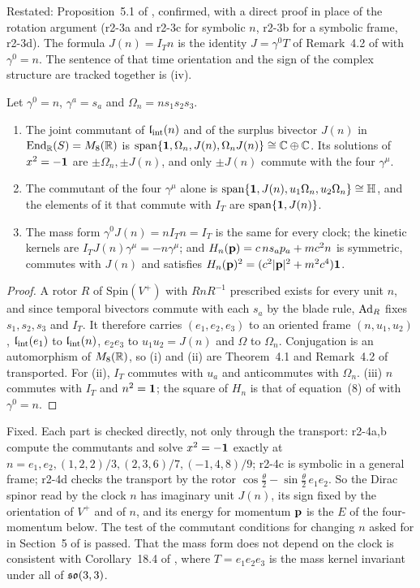 Restated: Proposition~5.1 of \cite{FMB}, confirmed, with a direct proof in place of the rotation argument (r2-3a and r2-3c for symbolic $n$, r2-3b for a
symbolic frame, r2-3d). The formula $J(n)=I_Tn$ is the identity $J=\gamma^0T$ of Remark~4.2 of \cite{ES17} with $\gamma^0=n$. The sentence of
\cite{FMB} that time orientation and the sign of the complex structure are tracked together is (iv).

\begin{theorem}
\label{r2:thm:i}
Let $\gamma^0=n$, $\gamma^a=s_a$ and $\Omega_n=ns_1s_2s_3$.
\begin{enumerate}[label=(\roman*),leftmargin=2.2em]
\item The joint commutant of $\mathfrak l_{\rm int}(n)$ and of the surplus bivector $J(n)$ in $\operatorname{End}_{\mathbb{R}}(S)=M_8(\mathbb{R})$ is $\operatorname{span}\{\mathbf 1,\Omega_n,J(n),\Omega_nJ(n)\}
\cong\mathbb{C}\oplus\mathbb{C}$. Its solutions of $x^2=-\mathbf 1$ are $\pm\Omega_n,\pm J(n)$, and only $\pm J(n)$ commute with the four $\gamma^\mu$.
\item The commutant of the four $\gamma^\mu$ alone is $\operatorname{span}\{\mathbf 1,J(n),u_1\Omega_n,u_2\Omega_n\}\cong\mathbb{H}$, and the elements of it that
commute with $I_T$ are $\operatorname{span}\{\mathbf 1,J(n)\}$.
\item The mass form $\gamma^0J(n)=nI_Tn=I_T$ is the same for every clock; the kinetic kernels are $I_TJ(n)\gamma^\mu=-n\gamma^\mu$; and
$H_n(\mathbf p)=c\,ns_ap_a+mc^2n$ is symmetric, commutes with $J(n)$ and satisfies $H_n(\mathbf p)^2=(c^2|\mathbf p|^2+m^2c^4)\mathbf 1$.
\end{enumerate}
\end{theorem}

\begin{proof}
A rotor $R$ of $\mathrm{Spin}(V^+)$ with $RnR^{-1}$ prescribed exists for every unit $n$, and since temporal bivectors commute with each $s_a$ by the
blade rule, $\operatorname{Ad}_R$ fixes $s_1,s_2,s_3$ and $I_T$. It therefore carries $(e_1,e_2,e_3)$ to an oriented frame $(n,u_1,u_2)$, $\mathfrak l_{\rm int}(e_1)$ to $\mathfrak l_{\rm int}(n)$,
$e_2e_3$ to $u_1u_2=J(n)$ and $\Omega$ to $\Omega_n$. Conjugation is an automorphism of $M_8(\mathbb{R})$, so (i) and (ii) are Theorem~4.1 and Remark~4.2 of
\cite{ES17} transported. For (ii), $I_T$ commutes with $u_a$ and anticommutes with $\Omega_n$. (iii) $n$ commutes with $I_T$ and $n^2=\mathbf 1$; the square of
$H_n$ is that of equation~(8) of \cite{ES17} with $\gamma^0=n$.
\end{proof}

Fixed. Each part is checked directly, not only through the transport: r2-4a,b compute the commutants and solve $x^2=-\mathbf 1$ exactly at
$n=e_1,e_2,(1,2,2)/3,(2,3,6)/7,(-1,4,8)/9$; r2-4c is symbolic in a general frame; r2-4d checks the transport by the rotor
$\cos\frac\theta2-\sin\frac\theta2\,e_1e_2$. So the Dirac spinor read by the clock $n$ has imaginary unit $J(n)$, its sign fixed by the orientation of
$V^+$ and of $n$, and its energy for momentum $\mathbf p$ is the $E$ of the four-momentum below. The test of the commutant conditions for changing $n$
asked for in Section~5 of \cite{FMB} is passed. That the mass form does not depend on the clock is consistent with Corollary~18.4 of \cite{ES17}, where
$T=e_1e_2e_3$ is the mass kernel invariant under all of $\mathfrak{so}(3,3)$.

